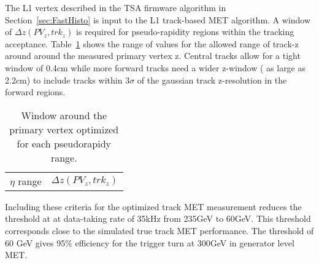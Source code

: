 The L1 vertex described in the TSA firmware algorithm in Section~\ref{sec:FastHisto} is input to the L1 track-based MET algorithm. A window of $\Delta z\left(PV_{z}, trk_{z}\right)$ is required for pseudo-rapidity regions within the tracking acceptance. Table~\ref{tab:zwindows} shows the range of values for the allowed range of track-z around around the measured primary vertex z. Central tracks allow for a tight window of 0.4cm while more forward tracks need a wider z-window ( as large as 2.2cm) to include tracks within $3\sigma$ of the gaussian track z-resolution in the forward regions.
\begin{table}[h]
\begin{tabular}{|c|c|}
$\eta$ range & $\Delta z\left(PV_{z}, trk_{z}\right)$\\
\end{tabular}

\caption{Window around the primary vertex optimized for each pseudorapidy range. }
\label{tab:zwindows}
\end{table}

Including these criteria for the optimized track MET measurement reduces the threshold at at data-taking rate of 35kHz from 235GeV to 60GeV. This threshold corresponds close to the simulated true track MET performance. The threshold of 60 GeV gives 95$\%$ efficiency for the trigger turn at 300GeV in generator level MET. 



